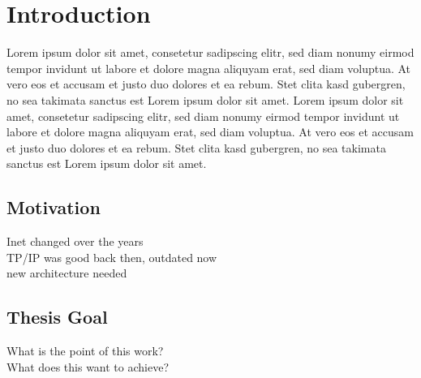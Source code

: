 \chapter{Introduction} \label{chapter:Introduction}

Lorem ipsum dolor sit amet, consetetur sadipscing elitr, sed diam nonumy eirmod tempor invidunt ut labore et dolore magna aliquyam erat, sed diam voluptua. At vero eos et accusam et justo duo dolores et ea rebum. Stet clita kasd gubergren, no sea takimata sanctus est Lorem ipsum dolor sit amet. Lorem ipsum dolor sit amet, consetetur sadipscing elitr, sed diam nonumy eirmod tempor invidunt ut labore et dolore magna aliquyam erat, sed diam voluptua. At vero eos et accusam et justo duo dolores et ea rebum. Stet clita kasd gubergren, no sea takimata sanctus est Lorem ipsum dolor sit amet.

\section{Motivation}
Inet changed over the years \\
TP/IP was good back then, outdated now \\
new architecture needed \\

\section{Thesis Goal}
What is the point of this work? \\
What does this want to achieve? \\

